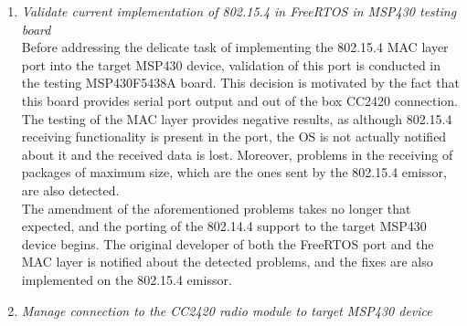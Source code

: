 		\begin{enumerate}
		\item \emph{Validate current implementation of 802.15.4 in FreeRTOS in MSP430 testing board}\\


		Before addressing the delicate task of implementing the 802.15.4 MAC layer port into the target MSP430 device, validation of this port is conducted in the testing MSP430F5438A board. This decision is motivated by the fact that this board provides serial port output and out of the box CC2420 connection.\\

		The testing of the MAC layer provides negative results, as although 802.15.4 receiving functionality is present in the port, the OS is not actually notified about it and the received data is lost. Moreover, problems in the receiving of packages of maximum size, which are the ones sent by the 802.15.4 emissor, are also detected.\\

		The amendment of the aforementioned problems takes no longer that expected, and the porting of the 802.14.4 support to the target MSP430 device begins. The original developer of both the FreeRTOS port and the MAC layer is notified about the detected problems, and the fixes are also implemented on the 802.15.4 emissor.\\

		\item\emph{Manage connection to the CC2420 radio module to target MSP430 device}\\



\end{enumerate}
